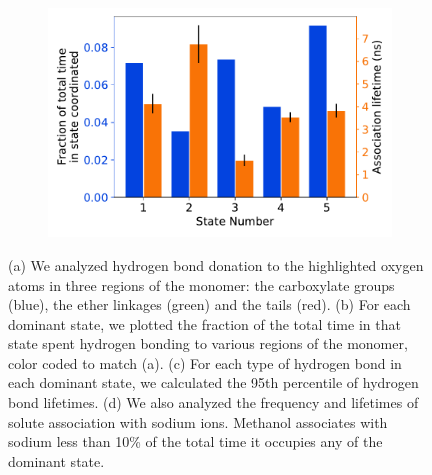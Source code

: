 \documentclass[journal=jpcbfk,manuscript=article]{achemso}
\begin{document}
\begin{figure}
\begin{subfigure}{0.475\textwidth}
  \caption{}\label{fig:hbond_lifetimes}
  \end{subfigure}
  \begin{subfigure}{0.475\textwidth}
  \includegraphics[width=\textwidth]{association_fraction_lifetimes.pdf}
  \caption{}\label{fig:association_fraction_lifetimes}
  \end{subfigure}
  \caption{(a) We analyzed hydrogen bond donation to the highlighted oxygen atoms in three 
  regions of the monomer: the carboxylate groups (blue), the ether linkages (green) and the
  tails (red). (b) For each dominant state, we plotted the fraction of the total time in
  that state spent hydrogen bonding to various regions of the monomer, color coded to match (a).
  (c) For each type of hydrogen bond in each dominant state, we calculated the 95th percentile
  of hydrogen bond lifetimes. (d) We also analyzed the frequency and lifetimes of solute 
  association with sodium ions. Methanol associates with sodium less than 10\% of the total 
  time it occupies any of the dominant state.
  }
  \label{fig:hydrogen_bonding}
  \end{figure}
  
\end{document}

